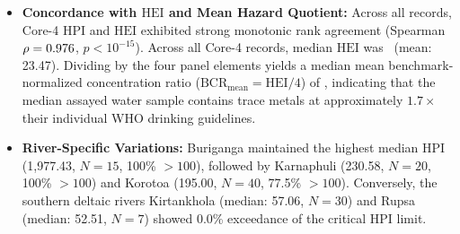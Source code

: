 \documentclass[authoryear,preprint,12pt]{elsarticle}
\begin{document}
\begin{itemize}
    \item \textbf{Concordance with $\mathrm{HEI}$ and Mean Hazard Quotient:} Across all records, Core-4 $\mathrm{HPI}$ and $\mathrm{HEI}$ exhibited strong monotonic rank agreement (Spearman $\rho = 0.976$, $p < 10^{-15}$). Across all Core-4 records, median $\mathrm{HEI}$ was \HeiMedian\ (mean: 23.47). Dividing by the four panel elements yields a median mean benchmark-normalized concentration ratio ($\mathrm{BCR}_{\mathrm{mean}} = \mathrm{HEI}/4$) of \MeanHqMedian, indicating that the median assayed water sample contains trace metals at approximately $1.7\times$ their individual WHO drinking guidelines.
    \item \textbf{River-Specific Variations:} Buriganga maintained the highest median $\mathrm{HPI}$ (1,977.43, $N=15$, 100\% $> 100$), followed by Karnaphuli (230.58, $N=20$, 100\% $> 100$) and Korotoa (195.00, $N=40$, 77.5\% $> 100$). Conversely, the southern deltaic rivers Kirtankhola (median: 57.06, $N=30$) and Rupsa (median: 52.51, $N=7$) showed 0.0\% exceedance of the critical $\mathrm{HPI}$ limit.
\end{itemize}
\end{document}
